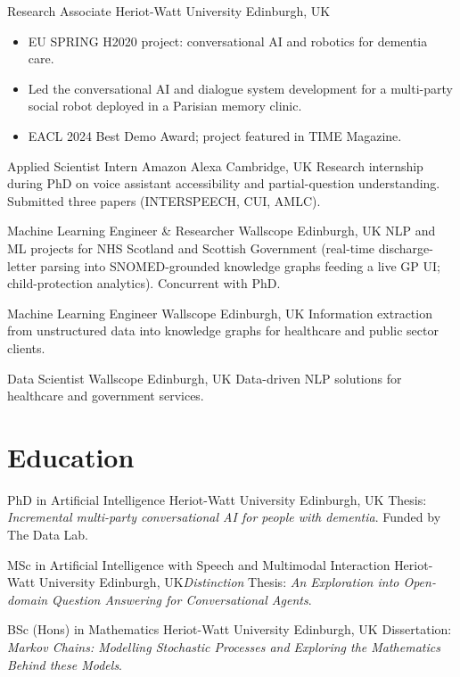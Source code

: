 \documentclass[11pt,a4paper,sans]{moderncv}
\begin{document}
{Research Associate}
{Heriot-Watt University}
{Edinburgh, UK}{}
{\begin{itemize}
\item EU SPRING H2020 project: conversational AI and robotics for dementia care.
\item Led the conversational AI and dialogue system development for a multi-party social robot deployed in a Parisian memory clinic.
\item EACL 2024 Best Demo Award; project featured in TIME Magazine.
\end{itemize}}

{Applied Scientist Intern}
{Amazon Alexa}
{Cambridge, UK}{}
{Research internship during PhD on voice assistant accessibility and partial-question understanding. Submitted three papers (INTERSPEECH, CUI, AMLC).}

{Machine Learning Engineer \& Researcher}
{Wallscope}
{Edinburgh, UK}{}
{NLP and ML projects for NHS Scotland and Scottish Government (real-time discharge-letter parsing into SNOMED-grounded knowledge graphs feeding a live GP UI; child-protection analytics). Concurrent with PhD.}

{Machine Learning Engineer}
{Wallscope}
{Edinburgh, UK}{}
{Information extraction from unstructured data into knowledge graphs for healthcare and public sector clients.}

{Data Scientist}
{Wallscope}
{Edinburgh, UK}{}
{Data-driven NLP solutions for healthcare and government services.}

\section{Education}

{PhD in Artificial Intelligence}
{Heriot-Watt University}
{Edinburgh, UK}{}
{Thesis: \emph{Incremental multi-party conversational AI for people with dementia}. Funded by The Data Lab.}

{MSc in Artificial Intelligence with Speech and Multimodal Interaction}
{Heriot-Watt University}
{Edinburgh, UK}{\textit{Distinction}}
{Thesis: \emph{An Exploration into Open-domain Question Answering for Conversational Agents}.}

{BSc (Hons) in Mathematics}
{Heriot-Watt University}
{Edinburgh, UK}{}
{Dissertation: \emph{Markov Chains: Modelling Stochastic Processes and Exploring the Mathematics Behind these Models}.}
\end{document}
